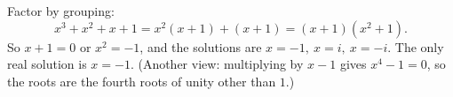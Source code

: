 Factor by grouping:
\[
x^3+x^2+x+1=x^2(x+1)+(x+1)=(x+1)(x^2+1).
\]
So $x+1=0$ or $x^2=-1$, and the solutions are $\boxed{x=-1,\ x=i,\ x=-i}$. The only real solution is $x=-1$. (Another view: multiplying by $x-1$ gives $x^4-1=0$, so the roots are the fourth roots of unity other than $1$.)
